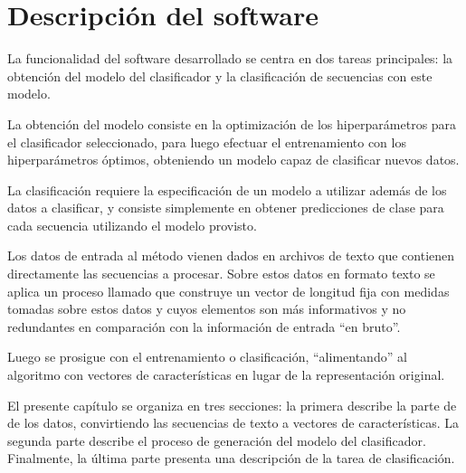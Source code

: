 %
%
%
%
\chapter{Descripción del software}
%
La funcionalidad del software desarrollado se centra en dos tareas
principales: la obtención del modelo del clasificador y la
clasificación de secuencias con este modelo.

La obtención del modelo consiste en la optimización de los
hiperparámetros para el clasificador seleccionado, para luego efectuar
el entrenamiento con los hiperparámetros óptimos, obteniendo un modelo
capaz de clasificar nuevos datos.

La clasificación requiere la especificación de un modelo a utilizar
además de los datos a clasificar, y consiste simplemente en obtener
predicciones de clase para cada secuencia utilizando el modelo
provisto.

Los datos de entrada al método vienen dados en archivos de texto que
contienen directamente las secuencias a procesar.  Sobre estos datos
en formato texto se aplica un proceso llamado  que construye un vector de longitud fija con
medidas tomadas sobre estos datos y cuyos elementos son más
informativos y no redundantes en comparación con la información de
entrada ``en bruto''.

Luego se prosigue con el entrenamiento o clasificación,
``alimentando'' al algoritmo con vectores de características en lugar
de la representación original.

El presente capítulo se organiza en tres secciones: la primera
describe la parte de  de los datos, convirtiendo
las secuencias de texto a vectores de características. La segunda
parte describe el proceso de generación del modelo del
clasificador. Finalmente, la última parte presenta una descripción de
la tarea de clasificación.
